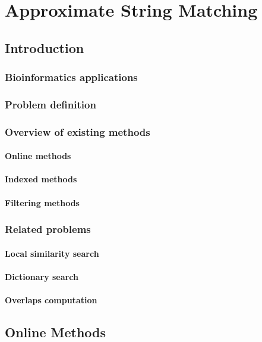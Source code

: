 \part{Approximate String Matching}

\chapter{Introduction}
\section{Bioinformatics applications}
\section{Problem definition}
\section{Overview of existing methods}
\subsection{Online methods}
\subsection{Indexed methods}
\subsection{Filtering methods}
\section{Related problems}
\subsection{Local similarity search}
\subsection{Dictionary search}
\subsection{Overlaps computation}

\chapter{Online Methods}
